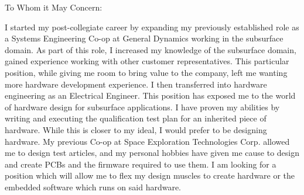 \documentclass[line]{res}
\begin{document}
\address{51 Irene St.}
\address{Chicopee MA 01013}
 
\begin{resume}
 \setlength\multicolsep{2pt}


 
\vspace{1in}
To Whom it May Concern:
 
I started my post-collegiate career by expanding my previously established role
as a Systems Engineering Co-op at General Dynamics working in the subsurface
domain. As part of this role, I increased my knowledge of the subsurface domain,
gained experience working with other customer representatives. %
This particular position, while giving me
room to bring value to the company, left me wanting more hardware development
experience. I then transferred into hardware engineering as an Electrical
Engineer. This position has exposed me to the world of hardware design for
subsurface applications. I have proven my abilities by writing and executing
the qualification test plan for an inherited piece of hardware. While this is
closer to my ideal, I would prefer to be designing hardware. My previous Co-op at
Space Exploration Technologies Corp. allowed me to design test articles, 
and my personal hobbies have given
me cause to design and create PCBs and the firmware required to use them. 
I am looking for a position which will allow me to flex my design muscles 
to create hardware or the embedded software which runs on said hardware. 
 

\end{resume}
\end{document}
